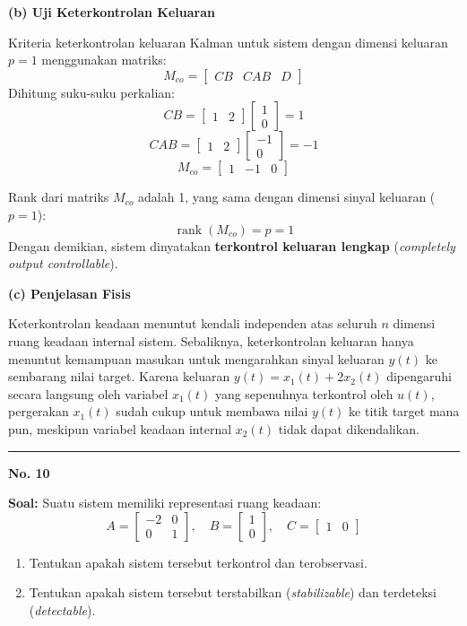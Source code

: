 \documentclass[11pt,a4paper]{article}
\begin{document}
\textbf{(b) Uji Keterkontrolan Keluaran}

Kriteria keterkontrolan keluaran Kalman untuk sistem dengan dimensi keluaran $p = 1$ menggunakan matriks:
$$M_{co} = \begin{bmatrix} CB & CAB & D \end{bmatrix}$$
Dihitung suku-suku perkalian:
$$CB = \begin{bmatrix} 1 & 2 \end{bmatrix} \begin{bmatrix} 1 \\ 0 \end{bmatrix} = 1$$
$$CAB = \begin{bmatrix} 1 & 2 \end{bmatrix} \begin{bmatrix} -1 \\ 0 \end{bmatrix} = -1$$
$$M_{co} = \begin{bmatrix} 1 & -1 & 0 \end{bmatrix}$$

Rank dari matriks $M_{co}$ adalah 1, yang sama dengan dimensi sinyal keluaran ($p = 1$):
$$\operatorname{rank}(M_{co}) = p = 1$$
Dengan demikian, sistem dinyatakan \textbf{terkontrol keluaran lengkap} (\textit{completely output controllable}).

\textbf{(c) Penjelasan Fisis}

Keterkontrolan keadaan menuntut kendali independen atas seluruh $n$ dimensi ruang keadaan internal sistem. Sebaliknya, keterkontrolan keluaran hanya menuntut kemampuan masukan untuk mengarahkan sinyal keluaran $y(t)$ ke sembarang nilai target. Karena keluaran $y(t) = x_1(t) + 2x_2(t)$ dipengaruhi secara langsung oleh variabel $x_1(t)$ yang sepenuhnya terkontrol oleh $u(t)$, pergerakan $x_1(t)$ sudah cukup untuk membawa nilai $y(t)$ ke titik target mana pun, meskipun variabel keadaan internal $x_2(t)$ tidak dapat dikendalikan.

\vspace{12pt}
\hrule
\vspace{10pt}

\textbf{\large No. 10}

\textbf{Soal:}  
Suatu sistem memiliki representasi ruang keadaan:
$$A = \begin{bmatrix} -2 & 0 \\ 0 & 1 \end{bmatrix}, \quad B = \begin{bmatrix} 1 \\ 0 \end{bmatrix}, \quad C = \begin{bmatrix} 1 & 0 \end{bmatrix}$$
\begin{enumerate}[label=(\alph*)]
    \item Tentukan apakah sistem tersebut terkontrol dan terobservasi.
    \item Tentukan apakah sistem tersebut terstabilkan (\textit{stabilizable}) dan terdeteksi (\textit{detectable}).
\end{enumerate}
\end{document}
